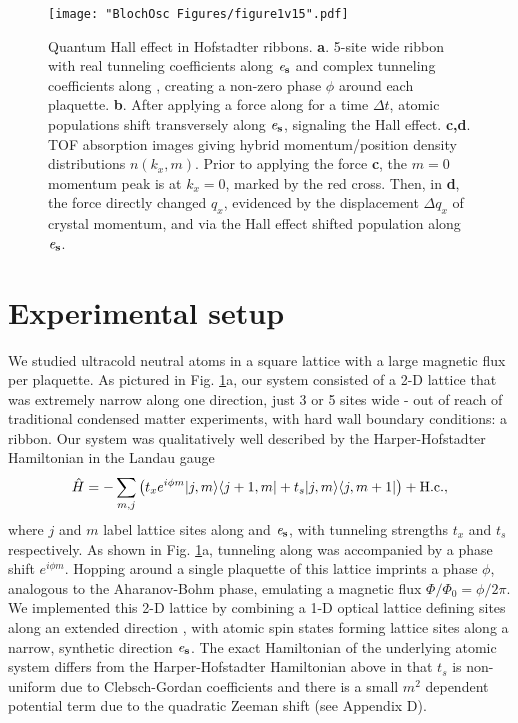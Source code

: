 \begin{figure*}
\texttt{[image: "BlochOsc Figures/figure1v15".pdf]}
\caption{Quantum Hall effect in Hofstadter ribbons. \textbf{a}. 5-site wide ribbon with real tunneling coefficients along $\bf{\mathit{e}_s}$   and complex tunneling coefficients along \ex,  creating a non-zero phase  $\phi$ around each plaquette.  \textbf{b}. After applying a force along \ex  for a time $\Delta t$, atomic populations shift transversely along $\bf{\mathit{e}_s}$, signaling the Hall effect. \textbf{c,d}.  TOF absorption images giving hybrid momentum/position density distributions $n(k_x,m)$. Prior to applying the force \textbf{c}, the $m=0$ momentum peak is at $k_x=0$, marked by the red cross. Then, in \textbf{d}, the force directly changed $q_x$, evidenced by the displacement $\Delta q_x$ of crystal momentum, and via the Hall effect shifted population along $\bf{\mathit{e}_s}$. }
\label{fig:laughlinPump}
\end{figure*}

\section{Experimental setup}
	
	We studied ultracold neutral atoms in a square lattice with a large magnetic flux per plaquette. As pictured in  Fig. \ref{fig:laughlinPump}a, our system consisted of a 2-D lattice that was extremely narrow along one direction, just 3 or 5 sites wide - out of reach of traditional condensed matter experiments, with hard wall boundary conditions: a ribbon. Our system was qualitatively well described by the Harper-Hofstadter Hamiltonian in the Landau gauge\cite{Harper1955,Hofstadter1976}
\begin{equation}
\hat{H}= -\sum\limits_{m,j}\left({t_x e^{i\phi m}|j,m\rangle\langle j+1,m|+t_s|j,m\rangle\langle j,m+1|}\right) + \rm{H.c.},
\label{eqn:Hamiltonian}
\end{equation}
where $j$ and $m$ label lattice sites along \ex    and $\bf{\mathit{e}_s}$, with tunneling strengths $t_x$ and $t_s$ respectively. As shown in Fig. \ref{fig:laughlinPump}a, tunneling along \ex    was accompanied by a phase shift $e^{i\phi m}$. Hopping around a single plaquette of this lattice imprints a phase $\phi$, analogous to the Aharanov-Bohm phase, emulating a magnetic flux $\Phi/\Phi_0=\phi/2\pi$. We implemented this 2-D lattice by combining a 1-D optical lattice defining sites along an extended direction \ex, with atomic spin states forming lattice sites along a narrow, synthetic\cite{Celi2014,Stuhl2015,Mancini2015,Meier2016} direction $\bf{\mathit{e}_s}$. The exact Hamiltonian of the underlying atomic system differs from the Harper-Hofstadter Hamiltonian above in that $t_s$ is non-uniform due to Clebsch-Gordan coefficients and there is a small $m^2$ dependent potential term due to the quadratic Zeeman shift (see Appendix D). 

